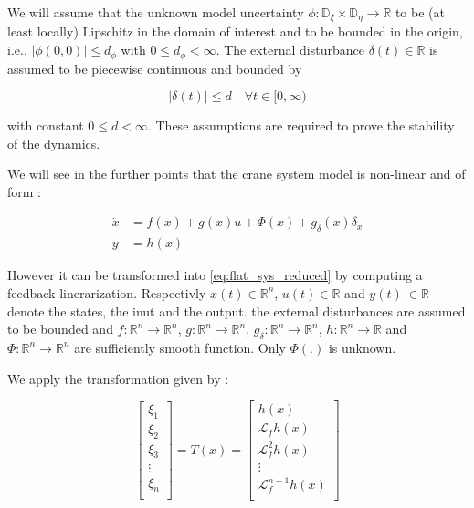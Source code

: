 We will assume that the unknown model uncertainty \(\phi: \mathbb{D}_{\xi} \times \mathbb{D}_{\eta} \rightarrow \mathbb{R}\) to be (at least locally) Lipschitz in the domain of interest and to be bounded in the origin, i.e., \(|\phi(0,0)| \leq d_{\phi}\) with \(0 \leq d_{\phi} < \infty\). The external disturbance \(\delta(t) \in \mathbb{R}\) is assumed to be piecewise continuous and bounded by

\begin{equation}
     |\delta(t)| \leq d \quad \forall t \in [0, \infty) 
\end{equation}

with constant \(0 \leq d < \infty\). These assumptions are required to prove the stability of the dynamics.

We will see in the further points that the crane system model is non-linear and of form : 

\begin{align}
    \dot{x} &= f(x) + g(x)u + \Phi(x) + g_\delta(x)\delta_x \\
    y &= h(x)
\end{align}

However it can be transformed into \ref{eq:flat_sys_reduced} by computing a feedback linerarization. Respectivly \(x(t) \in \mathbb{R}^{n} \), \(u(t) \in \mathbb{R}\) and \(y(t)\ \in \mathbb{R}\) denote the states, the inut and the output. the external disturbances are assumed to be bounded and \(f: \mathbb{R}^n \rightarrow \mathbb{R}^n\), \(g: \mathbb{R}^n \rightarrow \mathbb{R}^n\), \(g_\delta: \mathbb{R}^n \rightarrow \mathbb{R}^n\), \(h: \mathbb{R}^n \rightarrow \mathbb{R}\) and \(\Phi: \mathbb{R}^n \rightarrow \mathbb{R}^n\) are sufficiently smooth function. Only \(\Phi(.)\) is unknown.
 
We apply the transformation given by :

\begin{equation}
\begin{bmatrix}
\xi_1 \\
\xi_2 \\
\xi_3 \\
\vdots \\
\xi_n \\
\end{bmatrix}
=
T(x)
=
\begin{bmatrix}
h(x) \\
\mathcal{L}_f h(x) \\
\mathcal{L}_f^2 h(x) \\
\vdots \\
\mathcal{L}_f^{n-1} h(x) \\
\end{bmatrix}
\end{equation}

